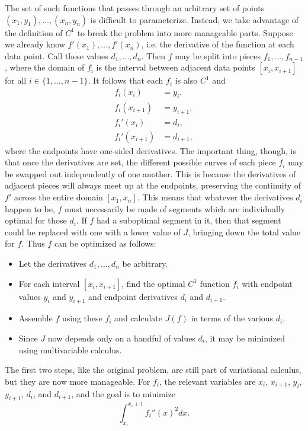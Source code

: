 \documentclass{article}
\begin{document}
The set of such functions that passes through an arbitrary set of points
$(x_1, y_1), \ldots, (x_n, y_n)$ is difficult to parameterize.
Instead, we take advantage of the definition of $C^1$
to break the problem into more manageable parts.
Suppose we already know $f'(x_1), \ldots, f'(x_n)$,
i.e. the derivative of the function at each data point.
Call these values $d_1, \ldots, d_n$.
Then $f$ may be split into pieces $f_1, \ldots, f_{n-1}$,
where the domain of $f_i$ is the interval between adjacent data points $[x_i, x_{i+1}]$
for all $i \in \{1, \ldots, n-1\}$.
It follows that each $f_i$ is also $C^1$ and
\begin{align*}
  f_i(x_i) &= y_i, \\
  f_i(x_{i+1}) &= y_{i+1}, \\
  f_i'(x_i) &= d_i, \\
  f_i'(x_{i+1}) &= d_{i+1},
\end{align*}
where the endpoints have one-sided derivatives.
The important thing, though, is that once the derivatives are set,
the different possible curves of each piece $f_i$
may be swapped out independently of one another.
This is because the derivatives of adjacent pieces will always meet up at the endpoints,
preserving the continuity of $f'$ across the entire domain $[x_1, x_n]$.
This means that whatever the derivatives $d_i$ happen to be,
$f$ must necessarily be made of segments which are individually optimal for those $d_i$.
If $f$ had a suboptimal segment in it,
then that segment could be replaced with one with a lower value of $J$,
bringing down the total value for $f$.
Thus $f$ can be optimized as follows:
\begin{itemize}
\item
  Let the derivatives $d_1, \ldots, d_n$ be arbitrary.
\item
  For each interval $[x_i, x_{i+1}]$, find the optimal $C^1$ function $f_i$
  with endpoint values $y_i$ and $y_{i+1}$
  and endpoint derivatives $d_i$ and $d_{i+1}$.
\item
  Assemble $f$ using these $f_i$ and calculate $J(f)$ in terms of the various $d_i$.
\item
  Since $J$ now depends only on a handful of values $d_i$,
  it may be minimized using multivariable calculus.
\end{itemize}

The first two steps, like the original problem, are still part of variational calculus,
but they are now more manageable.
For $f_i$, the relevant variables are
$x_i$, $x_{i+1}$, $y_i$, $y_{i+1}$, $d_i$, and $d_{i+1}$,
and the goal is to minimize
\[\int_{x_i}^{x_i+1}f_i''(x)^2 dx.\]
\end{document}
